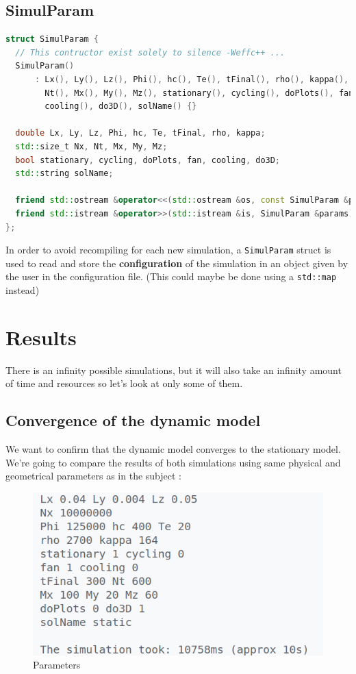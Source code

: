 \documentclass{article}
\begin{document}
\subsection{SimulParam}
\begin{lstlisting}[language=c++]
struct SimulParam {
  // This contructor exist solely to silence -Weffc++ ...
  SimulParam()
      : Lx(), Ly(), Lz(), Phi(), hc(), Te(), tFinal(), rho(), kappa(), Nx(),
        Nt(), Mx(), My(), Mz(), stationary(), cycling(), doPlots(), fan(),
        cooling(), do3D(), solName() {}

  double Lx, Ly, Lz, Phi, hc, Te, tFinal, rho, kappa;
  std::size_t Nx, Nt, Mx, My, Mz;
  bool stationary, cycling, doPlots, fan, cooling, do3D;
  std::string solName;

  friend std::ostream &operator<<(std::ostream &os, const SimulParam &params);
  friend std::istream &operator>>(std::istream &is, SimulParam &params);
};
\end{lstlisting}
In order to avoid recompiling for each new simulation, a \texttt{SimulParam} struct is used to read and store the \textbf{configuration} of the simulation in an object given by the user in the configuration file. (This could maybe be done using a \texttt{std::map} instead)

\section{Results}
There is an infinity possible simulations, but it will also take an infinity amount of time and resources so let's look at only some of them.

\subsection{Convergence of the dynamic model}
We want to confirm that the dynamic model converges to the stationary model. We're going to compare the results of both simulations using same physical and geometrical parameters as in the subject :

\begin{figure}[H]
    \centering
    \includegraphics[width=.5\linewidth]{params.png}
    \caption{Parameters}
    \label{fig:enter-labe}
\end{figure}
\end{document}

